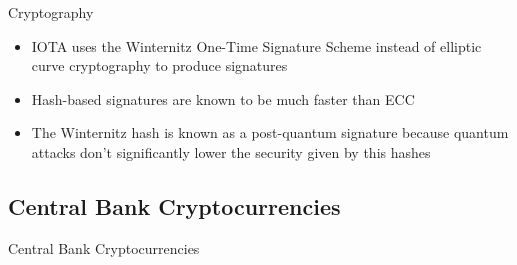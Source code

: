 \documentclass[11pt]{beamer}
\begin{document}

\begin{frame}{Cryptography}
	\begin{itemize}
		\item IOTA uses the Winternitz One-Time Signature Scheme instead of elliptic curve cryptography to produce signatures
		\item Hash-based signatures are known to be much faster than ECC
		\item The Winternitz hash is known as a post-quantum signature because quantum attacks don't significantly lower the security given by this hashes
	\end{itemize}
\end{frame}



\subsection{Central Bank Cryptocurrencies}

\begin{frame}
	\begin{center}
		\begin{large}
			Central Bank Cryptocurrencies
		\end{large}
	\end{center}
\end{frame}

\end{document}
